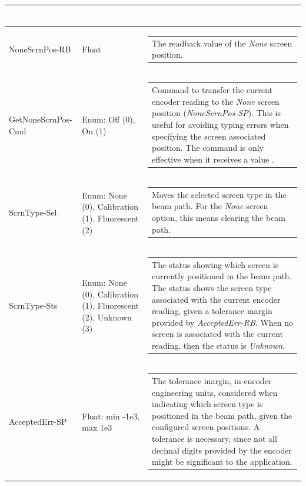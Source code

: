 \documentclass[openany]{article}
\begin{document}
\begin{longtable}{| m{4.5cm} m{2.5cm}  m{7.0cm} |}
\begin{tabular}{@{}m{6cm}@{}}
            \end{tabular} \hypertarget{}{}\\ \hline
        NoneScrnPos-RB & Float & \begin{tabular}{@{}m{6cm}@{}}
                The readback value of the \emph{None} screen position.
            \end{tabular} \hypertarget{pv:get-none-scrn-pos-cmd}{}\\ \hline
        GetNoneScrnPos-Cmd & Enum: Off (0), On (1) & \begin{tabular}{@{}m{6cm}@{}}
                Command to transfer the current encoder reading to the \emph{None} screen position (\emph{NoneScrnPos-SP}). This is useful for avoiding typing errors when specifying the screen associated position. The command is only effective when it receives a value $\neq 0$.
            \end{tabular} \hypertarget{pv:scrn-type}{}\\ \hline
        ScrnType-Sel & Enum: None (0), Calibration (1), Fluorescent (2) & \begin{tabular}{@{}m{6cm}@{}}
                Moves the selected screen type in the beam path. For the \emph{None} screen option, this means clearing the beam path.
            \end{tabular} \hypertarget{}{}\\ \hline
        ScrnType-Sts & Enum: None (0), Calibration (1), Fluorescent (2), Unknown (3) & \begin{tabular}{@{}m{6cm}@{}}
                The status showing which screen is currently positioned in the beam path. The status shows the screen type associated with the current encoder reading, given a tolerance margin provided by \emph{AcceptedErr-RB}. When no screen is associated with the current reading, then the status is \emph{Unknown}.
            \end{tabular} \hypertarget{pv:accepted-err}{}\\ \hline
        AcceptedErr-SP & Float: min -1e3, max 1e3 & \begin{tabular}{@{}m{6cm}@{}}
                The tolerance margin, in encoder engineering units, considered when indicating which screen type is positioned in the beam path, given the configured screen positions. A tolerance is necessary, since not all decimal digits provided by the encoder might be significant to the application. 
            \end{tabular} \hypertarget{}{}\\ \hline

\end{longtable}
\end{document}
